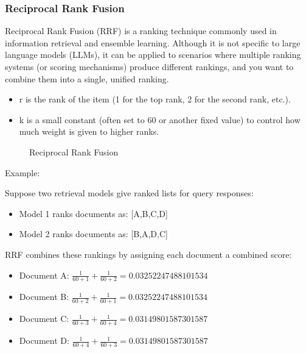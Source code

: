 \documentclass[letterpaper,11pt,english]{sphinxmanual}
\begin{document}
\subsubsection{Reciprocal Rank Fusion}
\label{\detokenize{rag:reciprocal-rank-fusion}}
\sphinxAtStartPar
Reciprocal Rank Fusion (RRF) is a ranking technique commonly used in information retrieval
and ensemble learning. Although it is not specific to large language models (LLMs), it can
be applied to scenarios where multiple ranking systems (or scoring mechanisms) produce
different rankings, and you want to combine them into a single, unified ranking.
\begin{description}
\begin{itemize}
\item {} 
\sphinxAtStartPar
r is the rank of the item (1 for the top rank, 2 for the second rank, etc.).

\item {} 
\sphinxAtStartPar
k is a small constant (often set to 60 or another fixed value) to control how much weight is given to higher ranks.

\end{itemize}

\end{description}

\begin{figure}[htbp]
\centering
\capstart

\noindent{}
\caption{Reciprocal Rank Fusion}\label{\detokenize{rag:id55}}\label{\detokenize{rag:fig-retriever}}\end{figure}

\sphinxAtStartPar
Example:

\sphinxAtStartPar
Suppose two retrieval models give ranked lists for query responses:
\begin{itemize}
\item {} 
\sphinxAtStartPar
Model 1 ranks documents as: {[}A,B,C,D{]}

\item {} 
\sphinxAtStartPar
Model 2 ranks documents as: {[}B,A,D,C{]}

\end{itemize}

\sphinxAtStartPar
RRF combines these rankings by assigning each document a combined score:
\begin{itemize}
\item {} 
\sphinxAtStartPar
Document A: \(\frac{1}{60+1} +\frac{1}{60+2}=0.03252247488101534\)

\item {} 
\sphinxAtStartPar
Document B: \(\frac{1}{60+2} +\frac{1}{60+1}=0.03252247488101534\)

\item {} 
\sphinxAtStartPar
Document C: \(\frac{1}{60+3} +\frac{1}{60+4}=0.03149801587301587\)

\item {} 
\sphinxAtStartPar
Document D: \(\frac{1}{60+4} +\frac{1}{60+3}=0.03149801587301587\)

\end{itemize}
\end{document}
